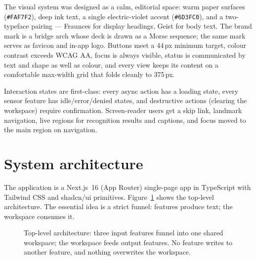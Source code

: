 \documentclass[11pt,a4paper]{article}
\newcommand{\code}[1]{\texttt{#1}}
\begin{document}
The visual system was designed as a calm, editorial space: warm paper surfaces (\code{\#FAF7F2}), deep ink text, a single electric-violet accent (\code{\#6D3FC0}), and a two-typeface pairing --- Fraunces for display headings, Geist for body text. The brand mark is a bridge arch whose deck is drawn as a Morse sequence; the same mark serves as favicon and in-app logo. Buttons meet a 44\,px minimum target, colour contrast exceeds WCAG AA, focus is always visible, status is communicated by text and shape as well as colour, and every view keeps its content on a comfortable max-width grid that folds cleanly to 375\,px.

Interaction states are first-class: every async action has a loading state, every sensor feature has idle/error/denied states, and destructive actions (clearing the workspace) require confirmation. Screen-reader users get a skip link, landmark navigation, live regions for recognition results and captions, and focus moved to the main region on navigation.

\section{System architecture}

The application is a Next.js~16 (App Router) single-page app in TypeScript with Tailwind CSS and shadcn/ui primitives. Figure~\ref{fig:arch} shows the top-level architecture. The essential idea is a strict funnel: features produce text; the workspace consumes it.

\begin{figure}[t]
\centering
{}
\caption{Top-level architecture: three input features funnel into one shared workspace; the workspace feeds output features. No feature writes to another feature, and nothing overwrites the workspace.}
\label{fig:arch}
\end{figure}
\end{document}
